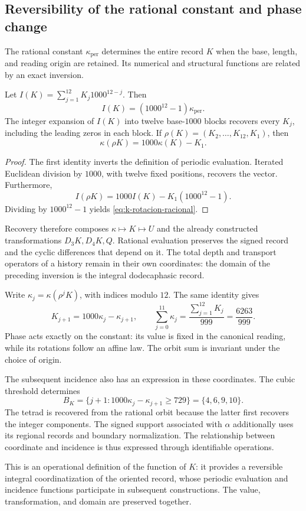 \subsection{Reversibility of the rational constant and phase change}

The rational constant \(\kappa_{\mathrm{per}}\) determines
the entire record \(K\) when the base, length, and reading origin
are retained. Its numerical and structural functions are related
by an exact inversion.

\begin{proposition}
Let \(I(K)=\sum_{j=1}^{12}K_j1000^{12-j}\). Then
\[
 I(K)=(1000^{12}-1)\kappa_{\mathrm{per}}.
\]
The integer expansion of \(I(K)\) into twelve base-\(1000\) blocks
recovers every \(K_j\), including the leading zeros in each block.
If \(\rho(K)=(K_2,\ldots,K_{12},K_1)\), then
\begin{equation}
 \kappa(\rho K)=1000\kappa(K)-K_1.
 \label{eq:k-rotacion-racional}
\end{equation}
\end{proposition}
\begin{proof}
The first identity inverts the definition of periodic evaluation.
Iterated Euclidean division by \(1000\), with twelve fixed positions,
recovers the vector. Furthermore,
\[
 I(\rho K)=1000I(K)-K_1(1000^{12}-1).
\]
Dividing by \(1000^{12}-1\) yields \eqref{eq:k-rotacion-racional}.
\end{proof}

Recovery therefore composes \(\kappa\mapsto K\mapsto U\)
and the already constructed transformations \(D_3K,D_4K,Q\).
Rational evaluation preserves the signed record and the cyclic differences
that depend on it. The total depth and transport operators of
a history remain in their own coordinates: the domain of the preceding
inversion is the integral dodecaphasic record.

Write \(\kappa_j=\kappa(\rho^jK)\), with indices modulo \(12\).
The same identity gives
\[
 K_{j+1}=1000\kappa_j-\kappa_{j+1},\qquad
 \sum_{j=0}^{11}\kappa_j=\frac{\sum_{j=1}^{12}K_j}{999}
 =\frac{6263}{999}.
\]
Phase acts exactly on the constant: its value is fixed
in the canonical reading, while its rotations follow an affine law.
The orbit sum is invariant under the choice of origin.

The subsequent incidence also has an expression in these
coordinates. The cubic threshold determines
\[
 B_K=\{j+1:1000\kappa_j-\kappa_{j+1}\ge729\}
 =\{4,6,9,10\}.
\]
The tetrad is recovered from the rational orbit because the latter
first recovers the integer components. The signed support associated
with \(\alpha\) additionally uses its regional records and boundary
normalization. The relationship between coordinate and incidence is thus
expressed through identifiable operations.

This is an operational definition of the function of \(K\): it provides
a reversible integral coordinatization of the oriented record, whose
periodic evaluation and incidence functions participate in
subsequent constructions. The value, transformation, and domain
are preserved together.

